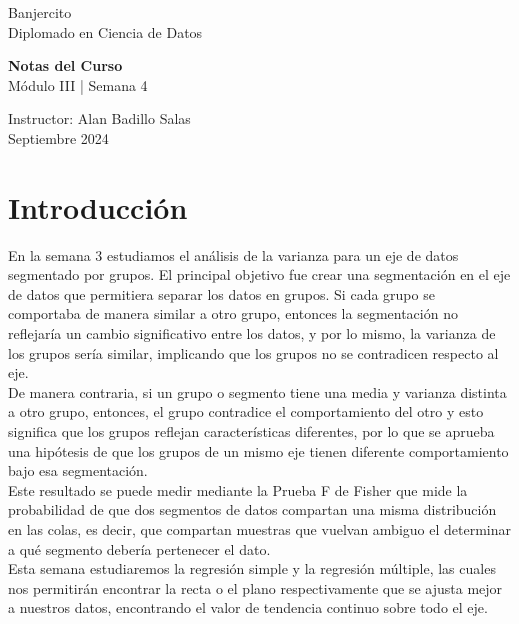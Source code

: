 \documentclass{article}
\begin{document}
\begin{center}
    \Large Banjercito \\[24pt]
    \Large Diplomado en Ciencia de Datos
\end{center}

\vfill

\begin{flushleft}
    \LARGE \textbf{Notas del Curso} \\[12pt]
    \LARGE Módulo III | Semana 4 \\[24pt]
\end{flushleft}

\vfil

\begin{flushleft}
    Instructor: Alan Badillo Salas \\[12pt]
    Septiembre 2024 \\[24pt]
\end{flushleft}

\vfill

\section{Introducción}
En la semana 3 estudiamos el análisis de la varianza para un eje de datos segmentado por grupos. El principal objetivo fue crear una segmentación en el eje de datos que permitiera separar los datos en grupos. Si cada grupo se comportaba de manera similar a otro grupo, entonces la segmentación no reflejaría un cambio significativo entre los datos, y por lo mismo, la varianza de los grupos sería similar, implicando que los grupos no se contradicen respecto al eje.
\\[12pt]
De manera contraria, si un grupo o segmento tiene una media y varianza distinta a otro grupo, entonces, el grupo contradice el comportamiento del otro y esto significa que los grupos reflejan características diferentes, por lo que se aprueba una hipótesis de que los grupos de un mismo eje tienen diferente comportamiento bajo esa segmentación.
\\[12pt]
Este resultado se puede medir mediante la Prueba F de Fisher que mide la probabilidad de que dos segmentos de datos compartan una misma distribución en las colas, es decir, que compartan muestras que vuelvan ambiguo el determinar a qué segmento debería pertenecer el dato.
\\[12pt]
Esta semana estudiaremos la regresión simple y la regresión múltiple, las cuales nos permitirán encontrar la recta o el plano respectivamente que se ajusta mejor a nuestros datos, encontrando el valor de tendencia continuo sobre todo el eje.
\end{document}
